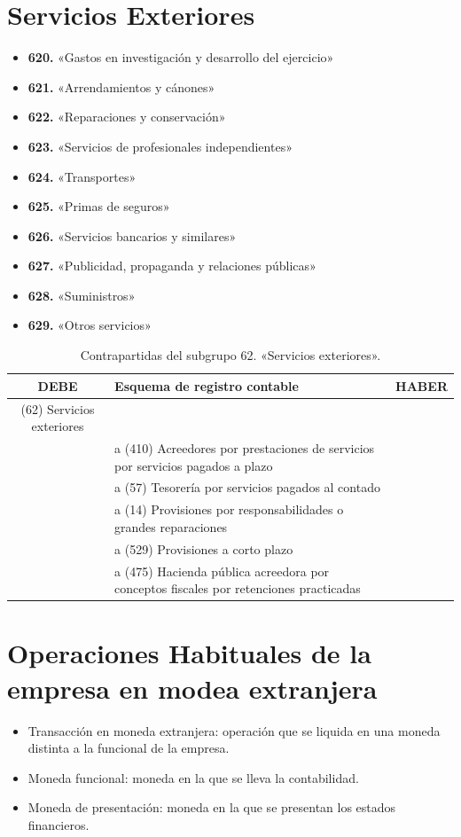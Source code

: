 \documentclass[a4paper,12pt]{article}
\begin{document}
\section{Servicios Exteriores}
\begin{itemize}
    \item \textbf{620.} «Gastos en investigación y desarrollo del ejercicio»
    \item \textbf{621.} «Arrendamientos y cánones»
    \item \textbf{622.} «Reparaciones y conservación»
    \item \textbf{623.} «Servicios de profesionales independientes»
    \item \textbf{624.} «Transportes»
    \item \textbf{625.} «Primas de seguros»
    \item \textbf{626.} «Servicios bancarios y similares»
    \item \textbf{627.} «Publicidad, propaganda y relaciones públicas»
    \item \textbf{628.} «Suministros»
    \item \textbf{629.} «Otros servicios»
\end{itemize}

\begin{table}[H]
    \centering
    \begin{tabular}{|c|p{7cm}|c|}
    \hline
    \textbf{DEBE} & \textbf{Esquema de registro contable} & \textbf{HABER} \\ \hline
    (62) Servicios exteriores &  &  \\ \hline
    & a (410) Acreedores por prestaciones de servicios por servicios pagados a plazo &  \\ \hline
    & a (57) Tesorería por servicios pagados al contado &  \\ \hline
    & a (14) Provisiones por responsabilidades o grandes reparaciones &  \\ \hline
    & a (529) Provisiones a corto plazo &  \\ \hline
    & a (475) Hacienda pública acreedora por conceptos fiscales por retenciones practicadas &  \\ \hline
    \end{tabular}
    \caption{Contrapartidas del subgrupo 62. «Servicios exteriores».}
\end{table}
    
    
\section{Operaciones Habituales de la empresa en modea extranjera}
\begin{itemize}
    \item Transacción en moneda extranjera: operación que se liquida en una moneda distinta a la funcional de la empresa.
    \item Moneda funcional: moneda en la que se lleva la contabilidad.
    \item Moneda de presentación: moneda en la que se presentan los estados financieros.
\end{itemize}
\end{document}
